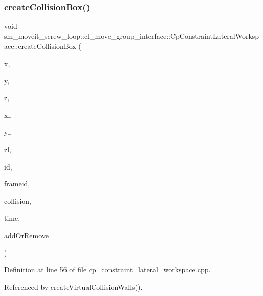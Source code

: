 \subsubsection{\texorpdfstring{create\+Collision\+Box()}{createCollisionBox()}}
{\footnotesize\ttfamily void sm\+\_\+moveit\+\_\+screw\+\_\+loop\+::cl\+\_\+move\+\_\+group\+\_\+interface\+::\+Cp\+Constraint\+Lateral\+Workspace\+::create\+Collision\+Box (\begin{DoxyParamCaption}\item[{float}]{x,  }\item[{float}]{y,  }\item[{float}]{z,  }\item[{float}]{xl,  }\item[{float}]{yl,  }\item[{float}]{zl,  }\item[{std\+::string}]{id,  }\item[{std\+::string}]{frameid,  }\item[{moveit\+\_\+msgs\+::\+Collision\+Object \&}]{collision,  }\item[{const ros\+::\+Time \&}]{time,  }\item[{int}]{add\+Or\+Remove }\end{DoxyParamCaption})}



Definition at line 56 of file cp\+\_\+constraint\+\_\+lateral\+\_\+workspace.\+cpp.



Referenced by create\+Virtual\+Collision\+Walls().


